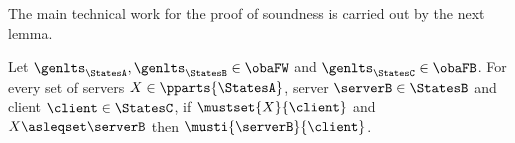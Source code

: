 


The main technical work for the proof of soundness is carried out by the next lemma.
\begin{lemma}
  \label{lem:soundness-set}
  Let $\genlts_\StatesA, \genlts_\StatesB \in \obaFW$ and
  $\genlts_\StatesC \in \obaFB$.
  For every set of servers $X \in \pparts{ \StatesA }$,
  server $\serverB \in \StatesB$ and client $\client \in \StatesC$,
  if $\mustset{X}{\client}$ and $X \asleqset \serverB$ then $\musti{\serverB}{\client}$.
\end{lemma}



